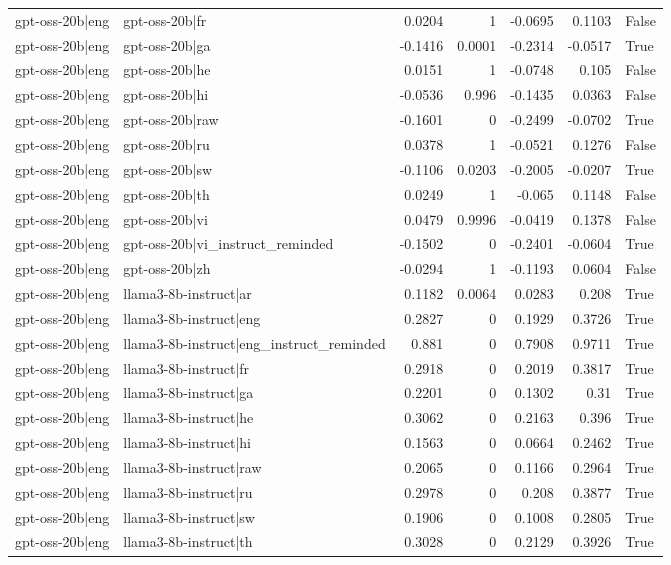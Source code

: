 \begin{table}
\begin{tabular}{l l r r r r l}
gpt-oss-20b|eng & gpt-oss-20b|fr & 0.0204 & 1 & -0.0695 & 0.1103 & False \\
gpt-oss-20b|eng & gpt-oss-20b|ga & -0.1416 & 0.0001 & -0.2314 & -0.0517 & True \\
gpt-oss-20b|eng & gpt-oss-20b|he & 0.0151 & 1 & -0.0748 & 0.105 & False \\
gpt-oss-20b|eng & gpt-oss-20b|hi & -0.0536 & 0.996 & -0.1435 & 0.0363 & False \\
gpt-oss-20b|eng & gpt-oss-20b|raw & -0.1601 & 0 & -0.2499 & -0.0702 & True \\
gpt-oss-20b|eng & gpt-oss-20b|ru & 0.0378 & 1 & -0.0521 & 0.1276 & False \\
gpt-oss-20b|eng & gpt-oss-20b|sw & -0.1106 & 0.0203 & -0.2005 & -0.0207 & True \\
gpt-oss-20b|eng & gpt-oss-20b|th & 0.0249 & 1 & -0.065 & 0.1148 & False \\
gpt-oss-20b|eng & gpt-oss-20b|vi & 0.0479 & 0.9996 & -0.0419 & 0.1378 & False \\
gpt-oss-20b|eng & gpt-oss-20b|vi_instruct_reminded & -0.1502 & 0 & -0.2401 & -0.0604 & True \\
gpt-oss-20b|eng & gpt-oss-20b|zh & -0.0294 & 1 & -0.1193 & 0.0604 & False \\
gpt-oss-20b|eng & llama3-8b-instruct|ar & 0.1182 & 0.0064 & 0.0283 & 0.208 & True \\
gpt-oss-20b|eng & llama3-8b-instruct|eng & 0.2827 & 0 & 0.1929 & 0.3726 & True \\
gpt-oss-20b|eng & llama3-8b-instruct|eng_instruct_reminded & 0.881 & 0 & 0.7908 & 0.9711 & True \\
gpt-oss-20b|eng & llama3-8b-instruct|fr & 0.2918 & 0 & 0.2019 & 0.3817 & True \\
gpt-oss-20b|eng & llama3-8b-instruct|ga & 0.2201 & 0 & 0.1302 & 0.31 & True \\
gpt-oss-20b|eng & llama3-8b-instruct|he & 0.3062 & 0 & 0.2163 & 0.396 & True \\
gpt-oss-20b|eng & llama3-8b-instruct|hi & 0.1563 & 0 & 0.0664 & 0.2462 & True \\
gpt-oss-20b|eng & llama3-8b-instruct|raw & 0.2065 & 0 & 0.1166 & 0.2964 & True \\
gpt-oss-20b|eng & llama3-8b-instruct|ru & 0.2978 & 0 & 0.208 & 0.3877 & True \\
gpt-oss-20b|eng & llama3-8b-instruct|sw & 0.1906 & 0 & 0.1008 & 0.2805 & True \\
gpt-oss-20b|eng & llama3-8b-instruct|th & 0.3028 & 0 & 0.2129 & 0.3926 & True \\

\end{tabular}
\end{table}
